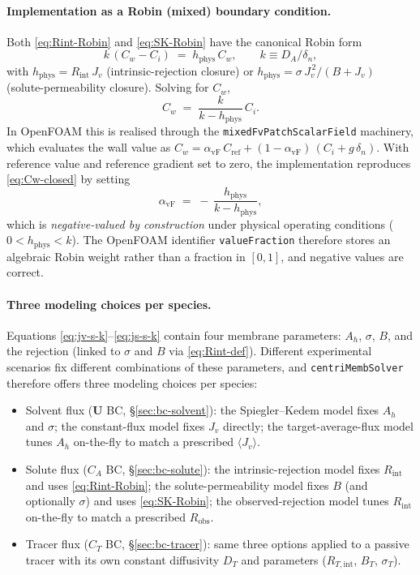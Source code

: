 \documentclass[11pt,a4paper]{article}
\begin{document}
\paragraph{Implementation as a Robin (mixed) boundary condition.}
Both \eqref{eq:Rint-Robin} and \eqref{eq:SK-Robin} have the canonical
Robin form
\begin{equation}
	k\,(C_w - C_i) \;=\; h_\mathrm{phys}\,C_w ,
	\qquad
	k \equiv D_A/\delta_n ,
	\label{eq:robin-canonical}
\end{equation}
with
\(h_\mathrm{phys} = R_\mathrm{int}\,J_v\) (intrinsic-rejection closure)
or
\(h_\mathrm{phys} = \sigma\,J_v^{\,2}/(B + J_v)\)
(solute-permeability closure). Solving for \(C_w\),
\begin{equation}
	C_w \;=\; \frac{k}{k - h_\mathrm{phys}}\,C_i .
	\label{eq:Cw-closed}
\end{equation}
In OpenFOAM this is realised through the
\texttt{mixedFvPatchScalarField} machinery, which evaluates the wall
value as
\(C_w = \alpha_\mathrm{vF}\,C_\mathrm{ref} + (1-\alpha_\mathrm{vF})\,(C_i + g\,\delta_n)\).
With reference value and reference gradient set to zero, the
implementation reproduces \eqref{eq:Cw-closed} by setting
\begin{equation}
	\alpha_\mathrm{vF} \;=\; -\,\frac{h_\mathrm{phys}}{k - h_\mathrm{phys}} ,
\end{equation}
which is \emph{negative-valued by construction} under physical
operating conditions
(\(0 < h_\mathrm{phys} < k\)). The OpenFOAM identifier
\texttt{valueFraction} therefore stores an algebraic Robin weight
rather than a fraction in \([0,1]\), and negative values are correct.

\paragraph{Three modeling choices per species.}
Equations \eqref{eq:jv-s-k}--\eqref{eq:js-s-k} contain four membrane
parameters: \(A_h\), \(\sigma\), \(B\), and the rejection (linked to
\(\sigma\) and \(B\) via \eqref{eq:Rint-def}). Different experimental
scenarios fix different combinations of these parameters, and
\texttt{centriMembSolver} therefore offers three modeling choices per
species:
\begin{itemize}
	\item Solvent flux (\(\mathbf{U}\) BC, \S\ref{sec:bc-solvent}): the
	Spiegler--Kedem model fixes \(A_h\) and \(\sigma\); the
	constant-flux model fixes \(J_v\) directly; the
	target-average-flux model tunes \(A_h\) on-the-fly to match a
	prescribed \(\langle J_v\rangle\).
	\item Solute flux (\(C_A\) BC, \S\ref{sec:bc-solute}): the
	intrinsic-rejection model fixes \(R_\mathrm{int}\) and uses
	\eqref{eq:Rint-Robin}; the solute-permeability model fixes
	\(B\) (and optionally \(\sigma\)) and uses \eqref{eq:SK-Robin};
	the observed-rejection model tunes \(R_\mathrm{int}\)
	on-the-fly to match a prescribed \(R_\mathrm{obs}\).
	\item Tracer flux (\(C_T\) BC, \S\ref{sec:bc-tracer}): same three
	options applied to a passive tracer with its own constant
	diffusivity \(D_T\) and parameters
	(\(R_{T,\mathrm{int}}\), \(B_T\), \(\sigma_T\)).
\end{itemize}
\end{document}

